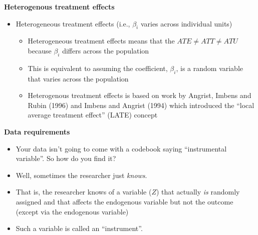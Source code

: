 \documentclass[notes=show]{beamer}
\begin{document}
\begin{frame}[plain]

\begin{center}
\textbf{Heterogenous treatment effects}
\end{center}

\begin{itemize}
		\item Heterogeneous treatment effects (i.e., $\beta_i$ varies across individual units)
			\begin{itemize}
			\item Heterogeneous treatment effects means that the $ATE\neq{ATT}\neq{ATU}$ because $\beta_i$ differs across the population
			\item This is equivalent to assuming the coefficient, $\beta_i$, is a random variable that varies across the population
			\item Heterogenous treatment effects is based on work by Angrist, Imbens and Rubin (1996) and Imbens and Angrist (1994) which introduced the  ``local average treatment effect'' (LATE) concept
			\end{itemize}
\end{itemize}

\end{frame}

\begin{frame}[plain]

\begin{center}
\textbf{Data requirements}
\end{center}

	\begin{itemize}
	\item Your data isn't going to come with a codebook saying ``instrumental variable''.  So how do you find it?
	\item Well, sometimes the researcher just \emph{knows}.  
	\item That is, the researcher knows of a variable ($Z$) that actually \emph{is} randomly assigned and that affects the endogenous variable but not the outcome (except via the endogenous variable)  
	\item Such a variable is called an ``instrument''.
	\end{itemize}
\end{frame}
\end{document}
